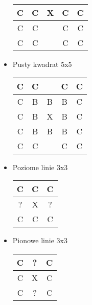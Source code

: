 \begin{itemize}
\begin{tabular}{|c|c|c|c|c|}
    \hline
    \cellcolor{black}C & \cellcolor{black}C & X &\cellcolor{black}C&\cellcolor{black}C\\
    \hline
    \cellcolor{black}C & \cellcolor{black}C & \cellcolor{black} &\cellcolor{black}C&\cellcolor{black}C\\
    \hline
    \cellcolor{black}C & \cellcolor{black}C & \cellcolor{black} &\cellcolor{black}C&\cellcolor{black}C\\
    \hline
\end{tabular}
\item Pusty kwadrat 5x5
\begin{tabular}{|c|c|c|c|c|}
    \hline
    \cellcolor{black}C & \cellcolor{black}C & \cellcolor{black} &\cellcolor{black}C&\cellcolor{black}C\\
    \hline
    \cellcolor{black}C & B & B &B&\cellcolor{black}C\\
    \hline
    \cellcolor{black}C &B & X &B&\cellcolor{black}C\\
    \hline
    \cellcolor{black}C & B& B&B&\cellcolor{black}C\\
    \hline
    \cellcolor{black}C & \cellcolor{black}C & \cellcolor{black} &\cellcolor{black}C&\cellcolor{black}C\\
    \hline
\end{tabular}
\item Poziome linie 3x3
\begin{tabular}{|c|c|c|}
    \hline
    \cellcolor{black}C & \cellcolor{black}C & \cellcolor{black}C \\
    \hline
    ? & X & ? \\
    \hline
    \cellcolor{black}C & \cellcolor{black}C &\cellcolor{black}C \\
    \hline
\end{tabular}
\item Pionowe linie 3x3
\begin{tabular}{|c|c|c|}
    \hline
    \cellcolor{black}C & ? & \cellcolor{black}C \\
    \hline
   \cellcolor{black}C& X & \cellcolor{black}C \\
    \hline
    \cellcolor{black}C & ? & \cellcolor{black}C \\
    \hline
\end{tabular}

\end{itemize}
